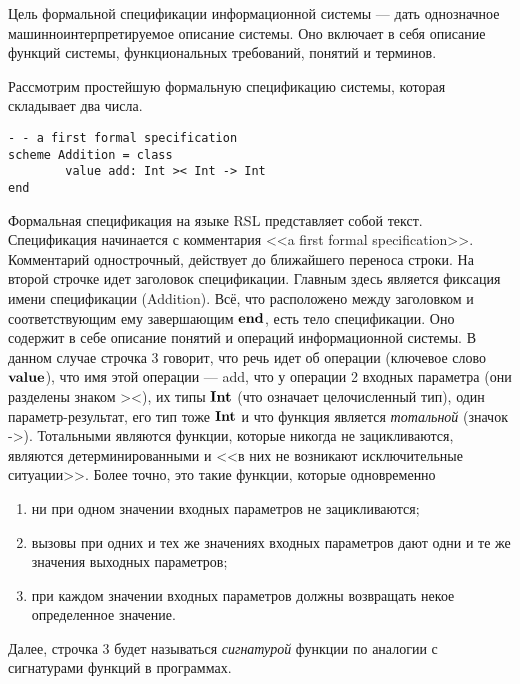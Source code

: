 \documentclass[12pt]{extreport}
\begin{document}
Цель формальной спецификации информационной системы --- дать однозначное машинноинтерпретируемое описание системы. Оно включает в себя описание функций системы, функциональных требований, понятий и терминов.

Рассмотрим простейшую формальную спецификацию системы, которая складывает два числа.

\begin{lstlisting}
- - a first formal specification
scheme Addition = class
        value add: Int >< Int -> Int
end
\end{lstlisting}

Формальная спецификация на языке RSL представляет собой текст. Спецификация начинается с комментария <<a first formal specification>>. Комментарий однострочный, действует до ближайшего переноса строки. На второй строчке идет заголовок спецификации. Главным здесь является фиксация имени спецификации (Addition). Всё, что расположено между заголовком и соответствующим ему завершающим $\textbf{end}$, есть тело спецификации. Оно содержит в себе описание понятий и операций информационной системы. В данном случае строчка 3 говорит, что речь идет об операции (ключевое слово $\textbf{value}$), что имя этой операции --- add, что у операции 2 входных параметра (они разделены знаком ><), их типы $\textbf{Int}$ (что означает целочисленный тип), один параметр-результат, его тип тоже $\textbf{Int}$ и что функция является \emph{тотальной} (значок ->). Тотальными являются функции, которые никогда не зацикливаются, являются детерминированными и <<в них не возникают исключительные ситуации>>. Более точно, это такие функции, которые одновременно
\begin{enumerate}
\item ни при одном значении входных параметров не зацикливаются;
\item вызовы при одних и тех же значениях входных параметров дают одни и те же значения выходных параметров;
\item при каждом значении входных параметров должны возвращать некое определенное значение.
\end{enumerate}

Далее, строчка 3 будет называться \emph{сигнатурой} функции по аналогии с сигнатурами функций в программах.
\end{document}

